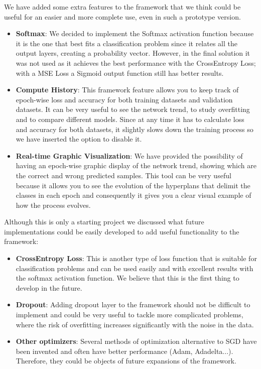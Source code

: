 We have added some extra features to the framework that we think could be useful for an easier and more complete use, even in such a prototype version.
\begin{itemize}
	\item \textbf{Softmax}: We decided to implement the Softmax activation function because it is the one that best fits a classification problem since it relates all the output layers, creating a probability vector. However, in the final solution it was not used as it achieves the best performance with the CrossEntropy Loss; with a MSE Loss a Sigmoid output function still has better results.
	\item \textbf{Compute History}: This framework feature allows you to keep track of epoch-wise loss and accuracy for both training datasets and validation datasets. It can be very useful to see the network trend, to study overfitting and to compare different models. Since at any time it has to calculate loss and accuracy for both datasets, it slightly slows down the training process so we have inserted the option to disable it.
	\item \textbf{Real-time Graphic Visualization}: We have provided the possibility of having an epoch-wise graphic display of the network trend, showing which are the correct and wrong predicted samples. This tool can be very useful because it allows you to see the evolution of the hyperplans that delimit the classes in each epoch and consequently it gives you a clear visual example of how the process evolves.
\end{itemize}

Although this is only a starting project we discussed what future implementations could be easily developed to add useful functionality to the framework:
\begin{itemize}
	\item \textbf{CrossEntropy Loss}: This is another type of loss function that is suitable for classification problems and can be used easily and with excellent results with the softmax activation function. We believe that this is the first thing to develop in the future.
	\item \textbf{Dropout}: Adding dropout layer to the framework should not be difficult to implement and could be very useful to tackle more complicated problems, where the risk of overfitting increases significantly with the noise in the data.
	\item \textbf{Other optimizers}: Several methods of optimization alternative to SGD have been invented and often have better performance (Adam, Adadelta...). Therefore, they could be objects of future expansions of the framework.
\end{itemize}
